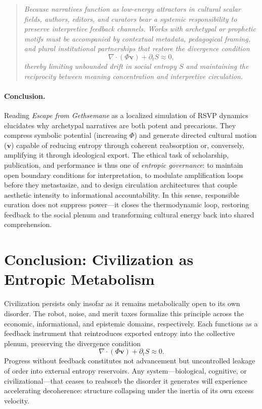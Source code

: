 \documentclass[12pt]{article}
\begin{document}
\begin{quote}
\emph{Because narratives function as low-energy attractors in cultural scalar fields, authors, editors, and curators bear a systemic responsibility to preserve interpretive feedback channels.  
Works with archetypal or prophetic motifs must be accompanied by contextual metadata, pedagogical framing, and plural institutional partnerships that restore the divergence condition  
\[
\nabla\!\cdot(\Phi\mathbf{v}) + \partial_t S \approx 0,
\]
thereby limiting unbounded drift in social entropy \(S\) and maintaining the reciprocity between meaning concentration and interpretive circulation.}
\end{quote}

\paragraph{Conclusion.}  
Reading \emph{Escape from Gethsemane} as a localized simulation of RSVP dynamics elucidates why archetypal narratives are both potent and precarious.  
They compress symbolic potential (increasing \(\Phi\)) and generate directed cultural motion (\(\mathbf{v}\)) capable of reducing entropy through coherent reabsorption or, conversely, amplifying it through ideological export.  
The ethical task of scholarship, publication, and performance is thus one of \emph{entropic governance}: to maintain open boundary conditions for interpretation, to modulate amplification loops before they metastasize, and to design circulation architectures that couple aesthetic intensity to informational accountability.  
In this sense, responsible curation does not suppress power---it closes the thermodynamic loop, restoring feedback to the social plenum and transforming cultural energy back into shared comprehension.

\section{Conclusion: Civilization as Entropic Metabolism}
Civilization persists only insofar as it remains metabolically open to its own disorder.  
The robot, noise, and merit taxes formalize this principle across the economic, informational, and epistemic domains, respectively.  
Each functions as a feedback instrument that reintroduces exported entropy into the collective plenum, preserving the divergence condition  
\[
\nabla\!\cdot(\Phi\mathbf{v}) + \partial_t S \approx 0.
\]
Progress without feedback constitutes not advancement but uncontrolled leakage of order into external entropy reservoirs.  
Any system—biological, cognitive, or civilizational—that ceases to reabsorb the disorder it generates will experience accelerating decoherence: structure collapsing under the inertia of its own excess velocity.  
\end{document}
